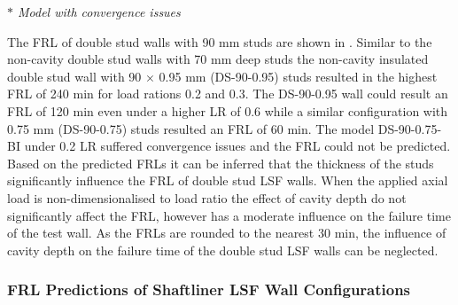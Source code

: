 \begin{table}[!htbp]
	\small \textit{$*$ Model with convergence issues}
  \end{table}%

The FRL of double stud walls with 90 mm studs are shown in . Similar to the non-cavity double stud walls with 70 mm deep studs the non-cavity insulated double stud wall with 90 $\times$ 0.95 mm (DS-90-0.95) studs resulted in the highest FRL of 240 min for load rations 0.2 and 0.3. The DS-90-0.95 wall could result an FRL of 120 min even under a higher LR of 0.6 while a similar configuration with 0.75 mm (DS-90-0.75) studs resulted an FRL of 60 min. The model DS-90-0.75-BI under 0.2 LR suffered convergence issues and the FRL could not be predicted. Based on the predicted FRLs it can be inferred that the thickness of the studs significantly influence the FRL of double stud LSF walls. When the applied axial load is non-dimensionalised to load ratio the effect of cavity depth do not significantly affect the FRL, however has a moderate influence on the failure time of the test wall. As the FRLs are rounded to the nearest 30 min, the influence of cavity depth on the failure time of the double stud LSF walls can be neglected. 

\subsubsection{FRL Predictions of Shaftliner LSF Wall Configurations}

